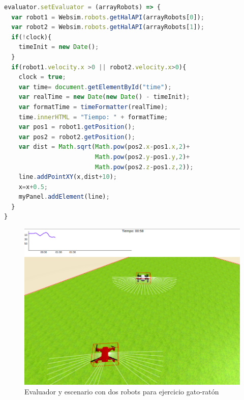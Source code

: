 \begin{lstlisting}[language=javascript,caption={Código JavaScript que calcula la distancia entre \textit{drones}, la representa e incorpora un cronómetro al \textit{DOM}}]
evaluator.setEvaluator = (arrayRobots) => {
  var robot1 = Websim.robots.getHalAPI(arrayRobots[0]);
  var robot2 = Websim.robots.getHalAPI(arrayRobots[1]);
  if(!clock){
    timeInit = new Date();
  }
  if(robot1.velocity.x >0 || robot2.velocity.x>0){
    clock = true;
    var time= document.getElementById("time");
    var realTime = new Date(new Date() - timeInit);
    var formatTime = timeFormatter(realTime);
    time.innerHTML = "Tiempo: " + formatTime;
    var pos1 = robot1.getPosition();
    var pos2 = robot2.getPosition();
    var dist = Math.sqrt(Math.pow(pos2.x-pos1.x,2)+
                         Math.pow(pos2.y-pos1.y,2)+
                         Math.pow(pos2.z-pos1.z,2));
    line.addPointXY(x,dist+10);
    x=x+0.5;
    myPanel.addElement(line);
  }
}
\end{lstlisting}
\begin{figure}[ht]
\centering           
\includegraphics[scale=0.3]{img/evaluador_drone.png}
\caption{Evaluador y escenario con dos robots para ejercicio gato-ratón}
\label{fig:evaluador_gato_raton}
\end{figure}
